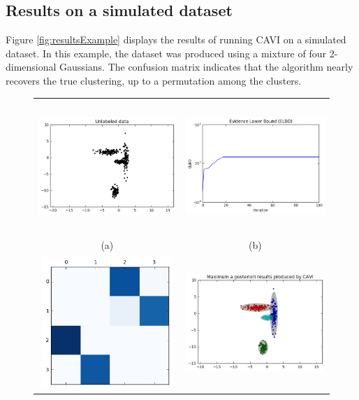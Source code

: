 \documentclass[11pt]{article}
\begin{document}
\clearpage
\subsection{Results on a simulated dataset}

Figure \ref{fig:resultsExample} displays the results of running CAVI on a simulated dataset.
In this example, the dataset was produced using a mixture of four 2-dimensional Gaussians.
The confusion matrix indicates that the algorithm nearly recovers the true clustering, up to a permutation among the clusters.

\begin{figure}[!ht]
\centering
\begin{tabular}{cc}
\includegraphics[height=5cm]{figures/unlabeled.png} &
\includegraphics[height=5cm]{figures/elbo.png} \\
(a) & (b) \\[10pt]
\includegraphics[height=5cm]{figures/confusion_matrix.png} &
\includegraphics[height=5cm]{figures/cavi_max_a_posteriori.png} \\

\end{tabular}
\end{figure}
\end{document}
